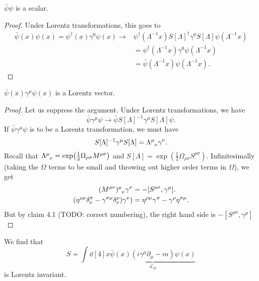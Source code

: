 \begin{claim}
  $\bar \psi \psi$ is a scalar.
\end{claim}
\begin{proof}
  Under Lorentz transformations, this goes to
  \begin{align}
    \bar\psi(x)\psi(x) = \psi^{\dagger}(x) \gamma^0 \psi(x) \to &\psi^{\dagger}(\Lambda^{-1} x) S[\Lambda]^{\dagger} \gamma^0 S[\Lambda] \psi(\Lambda^{-1} x) \\
								&= \psi^{\dagger}(\Lambda^{-1} x)\gamma^0 \psi(\Lambda^{-1} x) \\
								&= \bar \psi(\Lambda^{-1} x) \psi(\Lambda^{-1} x).
  \end{align}
\end{proof}
\begin{claim}
  $\bar \psi(x) \gamma^{\mu} \psi(x)$ is a Lorentz vector.
\end{claim}
\begin{proof}
  Let us suppress the argument. Under Lorentz transformations, we have
  \begin{equation}
    \bar\psi \gamma^{\mu} \psi \to \bar\psi S[\Lambda]^{-1} \gamma^{\mu} S[\Lambda]\psi.
  \end{equation}
  If $\bar\psi \gamma^{\mu} \psi$ is to be a Lorentz transformation, we must have
  \begin{equation}
    \label{eq:14-1}
    S[\Lambda]^{-1} \gamma^{\mu} S[\Lambda] = \Lambda \indices{^{\mu}_{\nu}} \gamma^{\nu}.
  \end{equation}
  Recall that $\Lambda \indices{^{\mu}_{\nu}} = \exp(\frac{1}{2} \Omega_{\rho\sigma} M^{\rho\sigma})$ and $S[\Lambda] = \exp(\frac{1}{2} \Omega_{\rho\sigma} S^{\rho\sigma})$.
  Infinitesimally (taking the $\Omega$ terms to be small and throwing out higher order terms in $\Omega$), we get
  \begin{align}
    (M^{\rho\sigma}) \indices{^{\mu}_{\nu}} \gamma^{\nu} &= - [S^{\rho\sigma}, \gamma^{\mu}]. \\
    (\eta^{\rho\mu} \delta^{\sigma}_{\nu} - \gamma^{\sigma\mu} \delta^{\rho}_{\nu}) \gamma^{\nu}) &= \eta^{\rho\mu} \gamma^{\sigma} - \gamma^{\rho} \eta^{\sigma\mu}.
  \end{align}
  But by claim 4.1 (TODO: correct numbering), the right hand side is $-[S^{\rho\sigma}, \gamma^{\mu}]$
\end{proof}
We find that
\begin{equation}
  \label{eq:14-dirac-lagrangian}
  \boxed{ S = \int \dd[4]{x} \underbrace{\bar\psi(x) (i \gamma^{\mu} \partial_{\mu} - m) \psi(x)}_{\mathcal{L}_D} }
\end{equation}
is Lorentz invariant.

